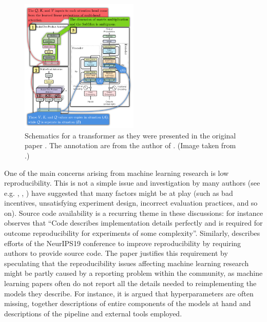 \documentclass[11pt,a4paper,openright,twoside]{report}
\theoremstyle{plain}
\theoremstyle{definition}
\newcommand\dblquote[1]{\textquotedblleft #1\textquotedblright}
\begin{document}
\begin{figure}[h]
  \begin{center}
    \includegraphics[width=0.5\textwidth]{figures/transformer_original.png}     
    \caption[Diagram of a transformer]{Schematics for a transformer as they were presented in the original paper \cite{vaswani2017attention}. The annotation are from the author of \cite{abbott2024neural}. (Image taken from \cite{abbott2023robust}.)}
    \label{fig: transformer}
  \end{center}
\end{figure}


One of the main concerns arising from machine learning research is low reproducibility. This is not a simple issue and investigation by many authors (see e.g. \cite{raff2019step}, \cite{pineau2021improving}, \cite{gundersen2022sources}) have suggested that many factors might be at play (such as bad incentives, unsatisfying experiment design, incorrect evaluation practices, and so on). Source code availability is a recurring theme in these discussions: for instance \cite{gundersen2022sources} observes that \dblquote{Code describes implementation details perfectly and is required for outcome reproducibility for experiments of some complexity}. Similarly, \cite{pineau2021improving} describes efforts of the NeurIPS19 conference to improve reproducibility by requiring authors to provide source code. The paper justifies this requirement by speculating that the reproducibility issues affecting machine learning research might be partly caused by a reporting problem within the community, as machine learning papers often do not report all the details needed to reimplementing the models they describe. For instance, it is argued that hyperparameters are often missing, together descriptions of entire components of the models at hand and descriptions of the pipeline and external tools employed.
\end{document}
